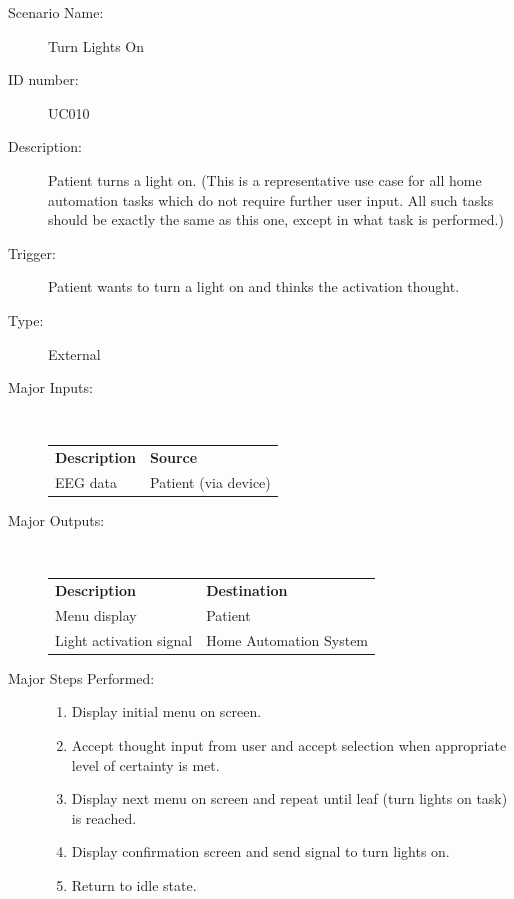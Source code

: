 \documentclass{article}
\begin{document}
\begin{description}
    \item[Scenario Name:] Turn Lights On
    \item[ID number:] UC010
    \item[Description:] Patient turns a light on. (This is a representative
        use case for all home automation tasks which do not require further
        user input. All such tasks should be exactly the same as this one,
        except in what task is performed.)
    \item[Trigger:] Patient wants to turn a light on and thinks the activation thought.
    \item[Type:] External
    \item[Major Inputs:] \hfill \\
        \begin{tabular}{l l}
            \textbf{Description} & \textbf{Source} \\
            EEG data & Patient (via device) \\
        \end{tabular}
    \item[Major Outputs:] \hfill \\
        \begin{tabular}{l l}
            \textbf{Description} & \textbf{Destination} \\
            Menu display & Patient \\
            Light activation signal & Home Automation System
        \end{tabular}
    \item[Major Steps Performed:] \hfill
        \begin{enumerate}
            \item Display initial menu on screen.
            \item Accept thought input from user and accept selection when
                appropriate level of certainty is met.
            \item Display next menu on screen and repeat until leaf (turn
                lights on task) is reached.
            \item Display confirmation screen and send signal to turn lights
                on.
            \item Return to idle state.
        \end{enumerate}
\end{description}

\hfill \\
\end{document}
